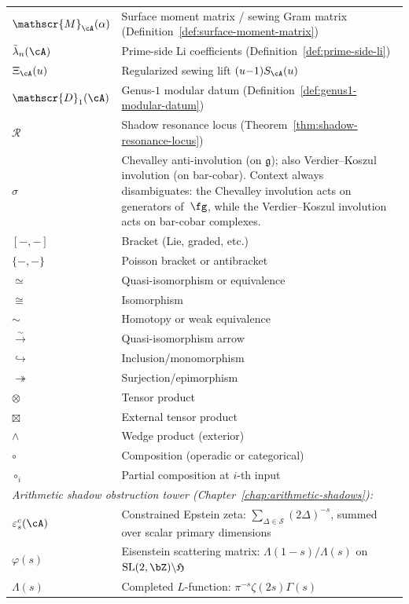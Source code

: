 \begin{longtable}{p{3cm} p{10cm}}
$\mathscr{M}_\cA(\alpha)$ & Surface moment matrix / sewing Gram matrix (Definition~\ref{def:surface-moment-matrix}) \\
$\tilde\lambda_n(\cA)$ & Prime-side Li coefficients (Definition~\ref{def:prime-side-li}) \\
$\Xi_\cA(u)$ & Regularized sewing lift $(u{-}1)S_\cA(u)$ \\
$\mathscr{D}_1(\cA)$ & Genus-$1$ modular datum (Definition~\ref{def:genus1-modular-datum}) \\
$\mathcal{R}$ & Shadow resonance locus (Theorem~\ref{thm:shadow-resonance-locus}) \\
$\sigma$ & Chevalley anti-involution (on $\mathfrak{g}$); also Verdier--Koszul involution (on bar-cobar). Context always disambiguates: the Chevalley involution acts on generators of~$\fg$, while the Verdier--Koszul involution acts on bar-cobar complexes. \\
$[-, -]$ & Bracket (Lie, graded, etc.) \\
$\{-, -\}$ & Poisson bracket or antibracket \\
%
$\simeq$ & Quasi-isomorphism or equivalence \\
$\cong$ & Isomorphism \\
$\sim$ & Homotopy or weak equivalence \\
$\xrightarrow{\sim}$ & Quasi-isomorphism arrow \\
$\hookrightarrow$ & Inclusion/monomorphism \\
%
$\twoheadrightarrow$ & Surjection/epimorphism \\
$\otimes$ & Tensor product \\
$\boxtimes$ & External tensor product \\
$\wedge$ & Wedge product (exterior) \\
$\circ$ & Composition (operadic or categorical) \\
$\circ_i$ & Partial composition at $i$-th input \\[6pt]
\multicolumn{2}{l}{\emph{Arithmetic shadow obstruction tower
 (Chapter~\ref{chap:arithmetic-shadows}):}} \\
$\varepsilon^c_s(\cA)$ & Constrained Epstein zeta:
 $\sum_{\Delta\in\mathcal{S}}(2\Delta)^{-s}$, summed over scalar
 primary dimensions \\
$\varphi(s)$ & Eisenstein scattering matrix:
 $\Lambda(1{-}s)/\Lambda(s)$ on
 $\mathrm{SL}(2,\bZ)\backslash\mathfrak{H}$ \\
$\Lambda(s)$ & Completed $L$-function:
 $\pi^{-s}\zeta(2s)\Gamma(s)$ \\

\end{longtable}
